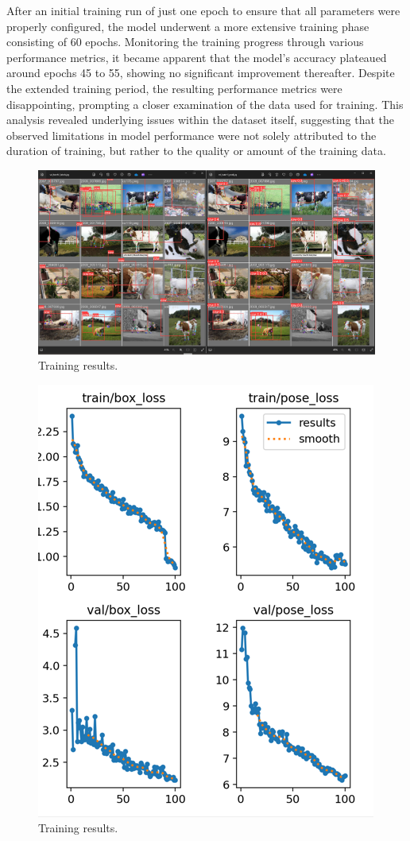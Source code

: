 After an initial training run of just one epoch to ensure that all parameters were properly configured, the model underwent a more extensive training phase consisting of 60 epochs. Monitoring the training progress through various performance metrics, it became apparent that the model's accuracy plateaued around epochs 45 to 55, showing no significant improvement thereafter. Despite the extended training period, the resulting performance metrics were disappointing, prompting a closer examination of the data used for training. This analysis revealed underlying issues within the dataset itself, suggesting that the observed limitations in model performance were not solely attributed to the duration of training, but rather to the quality or amount of the training data.
\newline
\begin{figure}[htbp]
    \centering
    \includegraphics[width=1.05\textwidth]{Images/trianresults.png}
    \caption{Training results.}
    \label{fig:trainresults}
\end{figure}

\begin{figure}[htbp]
    \centering
    \includegraphics[width=.8\textwidth]{Images/trainposeloss.png}
    \caption{Training results.}
    \label{fig:trainresults}
\end{figure}
\newpage
